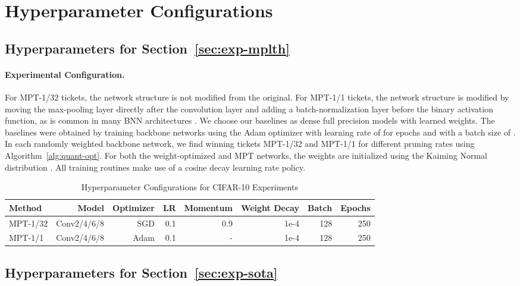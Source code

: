 \documentclass{article} \usepackage{iclr2021_conference,times}
\begin{document}
\newpage
\appendix
\section{Hyperparameter Configurations}
\label{sec:hyperparameters}
\subsection{Hyperparameters for Section~\ref{sec:exp-mplth}}
\paragraph{Experimental Configuration.} 
For MPT-1/32 tickets, the network structure is not modified from the original. For MPT-1/1 tickets, the network structure is modified by moving the max-pooling layer directly after the convolution layer and adding a batch-normalization layer before the binary activation function, as is common in many BNN architectures \citep{rastegari2016xnornet}. We choose our baselines as dense full precision models with learned weights. The baselines were obtained by training backbone networks using the Adam optimizer with learning rate of  for  epochs and with a batch size of . In each randomly weighted backbone network, we find winning tickets MPT-1/32 and MPT-1/1 for different pruning rates using Algorithm~\ref{alg:quant-opt}. For both the weight-optimized and MPT networks, the weights are initialized using the Kaiming Normal distribution \citep{he2015delving}. All training routines make use of a cosine decay learning rate policy.

\begin{table*}[h] 
\centering
\begin{small}
\begin{tabular}{@{}lrrrrrrr@{}}\toprule
\textbf{Method} & \textbf{Model} & \textbf{Optimizer} & \textbf{LR} & \textbf{Momentum} & \textbf{Weight Decay} & \textbf{Batch} & \textbf{Epochs} \\ \midrule
MPT-1/32 & Conv2/4/6/8 & SGD & 0.1 & 0.9 & 1e-4 & 128 & 250 \\ \hdashline
MPT-1/1 & Conv2/4/6/8 & Adam & 0.1 & - & 1e-4 & 128 & 250 \\
\bottomrule
\end{tabular}
\end{small}
\caption{Hyperparameter Configurations for CIFAR-10 Experiments}
\label{table:cifar-10-hyperparams}
\end{table*} 

\subsection{Hyperparameters for Section~\ref{sec:exp-sota}}
\end{document}
